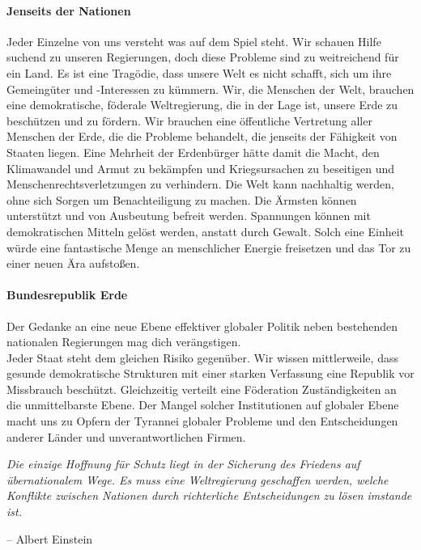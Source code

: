 \documentclass[11pt,a4paper]{article}
\begin{document}
\begin{multicols}{2}

\paragraph{Jenseits der Nationen} 

Jeder Einzelne von uns versteht was auf dem Spiel steht.
Wir schauen Hilfe suchend zu unseren Regierungen, doch diese Probleme sind zu weitreichend für ein Land.
Es ist eine Tragödie, dass unsere Welt es nicht schafft, sich um ihre Gemeingüter und -Interessen zu kümmern.
Wir, die Menschen der Welt, brauchen eine demokratische, föderale Weltregierung, die in der Lage ist, unsere Erde zu beschützen und zu fördern.
\noindent Wir brauchen eine öffentliche Vertretung aller Menschen der Erde, die die Probleme behandelt, die jenseits der Fähigkeit von Staaten liegen.
Eine Mehrheit der Erdenbürger hätte damit die Macht, den Klimawandel und Armut zu bekämpfen und Kriegsursachen zu beseitigen und Menschenrechtsverletzungen zu verhindern.
Die Welt kann nachhaltig werden, ohne sich Sorgen um Benachteiligung zu machen.
Die Ärmsten können unterstützt und von Ausbeutung befreit werden.
Spannungen können mit demokratischen Mitteln gelöst werden, anstatt durch Gewalt.
Solch eine Einheit würde eine fantastische Menge an menschlicher Energie freisetzen und das Tor zu einer neuen Ära aufstoßen.

\paragraph{Bundesrepublik Erde}

Der Gedanke an eine neue Ebene effektiver globaler Politik neben bestehenden nationalen Regierungen mag dich verängstigen.\\
\noindent Jeder Staat steht dem gleichen Risiko gegenüber.
Wir wissen mittlerweile, dass gesunde demokratische Strukturen mit einer starken Verfassung eine Republik vor Missbrauch beschützt.
Gleichzeitig verteilt eine Föderation Zuständigkeiten an die unmittelbarste Ebene.
Der Mangel solcher Institutionen auf globaler Ebene macht uns zu Opfern der Tyrannei globaler Probleme und den Entscheidungen anderer Länder und unverantwortlichen Firmen.

\vspace{-4pt}
\begin{shaded*}
\noindent \textit{Die einzige Hoffnung für Schutz liegt in der Sicherung des Friedens auf übernationalem Wege. Es muss eine Weltregierung geschaffen werden, welche Konflikte zwischen Nationen durch richterliche Entscheidungen zu lösen imstande ist.}
\begin{flushright}
-- Albert Einstein
\end{flushright}
\vspace{-12pt}
\end{shaded*}
\vspace{-17pt}

\end{multicols}
\end{document}
